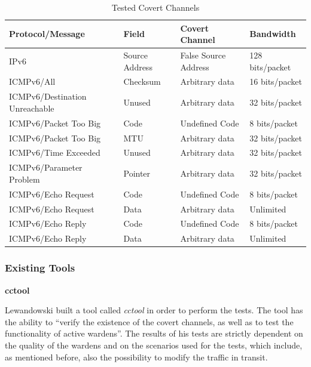 \documentclass[12pt]{article}
\begin{document}
\begin{savenotes}
\begin{table}[!htpb]
\centering
\begin{tabular}{|C{4.5cm}|C{3.0cm}|C{3.5cm}|C{3.0cm}|}
\hline
Protocol/Message&Field&Covert Channel&Bandwidth\\
\hline
IPv6&Source Address&False Source Address&128 bits/packet\\
\hline
ICMPv6/All&Checksum&Arbitrary data&16 bits/packet\\
\hline
ICMPv6/Destination Unreachable&Unused&Arbitrary data&32 bits/packet\\
\hline
ICMPv6/Packet Too Big&Code&Undefined Code&8 bits/packet\\
\hline
ICMPv6/Packet Too Big&MTU&Arbitrary data&32 bits/packet\\
\hline
ICMPv6/Time Exceeded&Unused&Arbitrary data&32 bits/packet\\
\hline
ICMPv6/Parameter Problem&Pointer&Arbitrary data&32 bits/packet\\
\hline
ICMPv6/Echo Request&Code&Undefined Code&8 bits/packet\\
\hline
ICMPv6/Echo Request&Data&Arbitrary data&Unlimited\\
\hline
ICMPv6/Echo Reply&Code&Undefined Code&8 bits/packet\\
\hline
ICMPv6/Echo Reply&Data&Arbitrary data&Unlimited\\
\hline
\end{tabular}
\caption{Tested Covert Channels\cite{lewandowski}}
\label{table:testedCC}
\end{table}
\end{savenotes}

\subsubsection{Existing Tools}
\label{subsub:tools}

\textbf{cctool}

Lewandowski built a tool called \textit{cctool} in order to perform the tests. The tool has the ability to ``verify the existence of the covert channels, as well as to test the functionality of active wardens''. The results of his tests are strictly dependent on the quality of the wardens and on the scenarios used for the tests, which include, as mentioned before, also the possibility to modify the traffic in transit\cite{lewandowski}.
\end{document}
